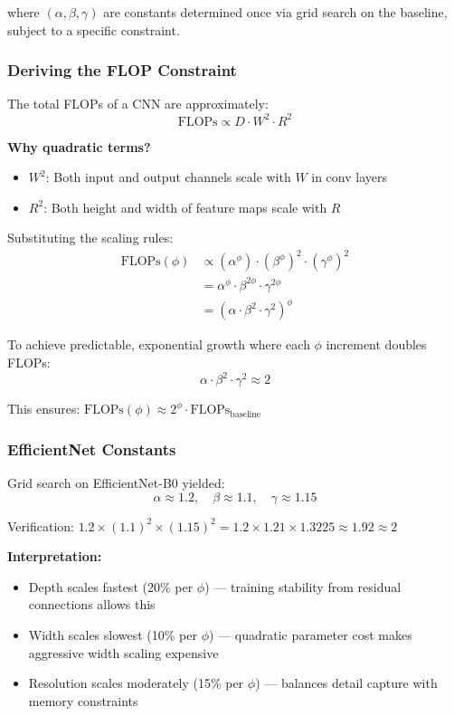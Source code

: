 \documentclass{article}
\begin{document}
where $(\alpha, \beta, \gamma)$ are constants determined once via grid search on the baseline, subject to a specific constraint.

\subsubsection{Deriving the FLOP Constraint}

The total FLOPs of a CNN are approximately:
\begin{equation}
\text{FLOPs} \propto D \cdot W^2 \cdot R^2
\end{equation}

\textbf{Why quadratic terms?}
\begin{itemize}
    \item $W^2$: Both input and output channels scale with $W$ in conv layers
    \item $R^2$: Both height and width of feature maps scale with $R$
\end{itemize}

Substituting the scaling rules:
\begin{align}
\text{FLOPs}(\phi) &\propto (\alpha^\phi) \cdot (\beta^\phi)^2 \cdot (\gamma^\phi)^2 \\
&= \alpha^\phi \cdot \beta^{2\phi} \cdot \gamma^{2\phi} \\
&= (\alpha \cdot \beta^2 \cdot \gamma^2)^\phi
\end{align}

To achieve predictable, exponential growth where each $\phi$ increment doubles FLOPs:
\begin{equation}
\alpha \cdot \beta^2 \cdot \gamma^2 \approx 2
\end{equation}

This ensures: $\text{FLOPs}(\phi) \approx 2^\phi \cdot \text{FLOPs}_{\text{baseline}}$

\subsubsection{EfficientNet Constants}

Grid search on EfficientNet-B0 yielded:
\begin{equation}
\alpha \approx 1.2, \quad \beta \approx 1.1, \quad \gamma \approx 1.15
\end{equation}

Verification: $1.2 \times (1.1)^2 \times (1.15)^2 = 1.2 \times 1.21 \times 1.3225 \approx 1.92 \approx 2$ \checkmark

\textbf{Interpretation:}
\begin{itemize}
    \item Depth scales fastest (20\% per $\phi$) --- training stability from residual connections allows this
    \item Width scales slowest (10\% per $\phi$) --- quadratic parameter cost makes aggressive width scaling expensive
    \item Resolution scales moderately (15\% per $\phi$) --- balances detail capture with memory constraints
\end{itemize}
\end{document}
